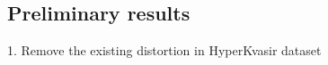 \documentclass{libs/ufc_format}
\begin{document}
\subsection{Preliminary results}
\begin{frame}{1. Remove the existing distortion in HyperKvasir dataset}







\end{frame}
\end{document}
